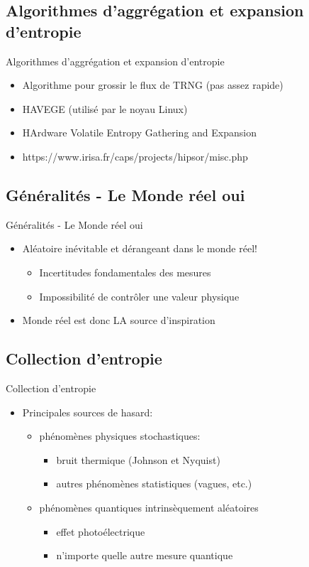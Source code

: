 \documentclass{beamer}
\begin{document}
\subsection{Algorithmes d'aggrégation et expansion d'entropie}
\begin{frame}{Algorithmes d'aggrégation et expansion d'entropie}
 \begin{itemize}
 \item Algorithme pour grossir le flux de TRNG (pas assez rapide)
 \item HAVEGE (utilisé par le noyau Linux)
 \item HArdware Volatile Entropy Gathering and Expansion
 \item https://www.irisa.fr/caps/projects/hipsor/misc.php
 \end{itemize}
\end{frame}
\subsection{Généralités - Le Monde réel oui}
\begin{frame}{Généralités - Le Monde réel oui}
 \begin{itemize}
 \item Aléatoire inévitable et dérangeant dans le monde réel!
   \begin{itemize}
   \item Incertitudes fondamentales des mesures
   \item Impossibilité de contrôler une valeur physique
   \end{itemize}
 \item Monde réel est donc LA source d’inspiration
 \end{itemize}
\end{frame}
\subsection{Collection d'entropie}
\begin{frame}{Collection d'entropie}
  \begin{itemize}
  \item Principales sources de hasard:
    \begin{itemize}
    \item phénomènes physiques stochastiques:
      \begin{itemize}
      \item bruit thermique (Johnson et Nyquist)
      \item autres phénomènes statistiques (vagues, etc.)
      \end{itemize}
    \item phénomènes quantiques intrinsèquement aléatoires
      \begin{itemize}
      \item effet photoélectrique
      \item n’importe quelle autre mesure quantique
      \end{itemize}
    \end{itemize}
  \end{itemize}
\end{frame}
\end{document}
